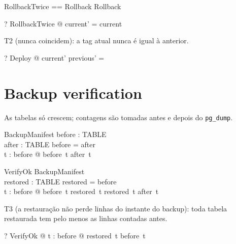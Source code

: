 \documentclass{article}
\begin{document}
\begin{zed}
  RollbackTwice == Rollback \semi Rollback
\end{zed}

\begin{zed}
  \vdash? \forall RollbackTwice @ current' = current
\end{zed}

T2 (nunca coincidem): a tag atual nunca é igual à anterior.

\begin{zed}
  \vdash? \forall Deploy @ current' \cap previous' = \emptyset
\end{zed}

\section*{Backup verification}

As tabelas só crescem; contagens são tomadas antes e depois do \texttt{pg\_dump}.

\begin{schema}{BackupManifest}
  before : TABLE \pfun \nat \\
  after : TABLE \pfun \nat
\where
  \dom before = \dom after \\
  \forall t : \dom before @ before~t \leq after~t
\end{schema}

\begin{schema}{VerifyOk}
  BackupManifest \\
  restored : TABLE \pfun \nat
\where
  \dom restored = \dom before \\
  \forall t : \dom before @ before~t \leq restored~t \land restored~t \leq after~t
\end{schema}

T3 (a restauração não perde linhas do instante do backup): toda tabela restaurada tem pelo menos as linhas contadas antes.

\begin{zed}
  \vdash? \forall VerifyOk @ \forall t : \dom before @ restored~t \geq before~t
\end{zed}
\end{document}
